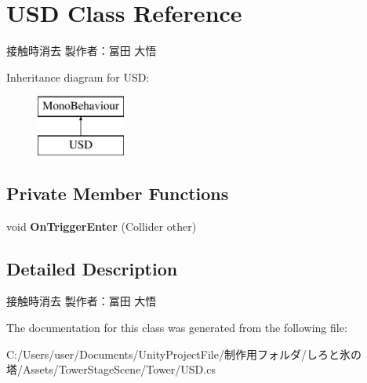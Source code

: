 \hypertarget{class_u_s_d}{}\section{U\+SD Class Reference}
\label{class_u_s_d}


接触時消去 製作者：冨田 大悟  


Inheritance diagram for U\+SD\+:\begin{figure}[H]
\begin{center}
\leavevmode
\includegraphics[height=2.000000cm]{class_u_s_d}
\end{center}
\end{figure}
\subsection*{Private Member Functions}
\begin{DoxyCompactItemize}
\item 
\mbox{\label{class_u_s_d_a606f7345e01f25c3c7901595c76ce921}} 
void {\bfseries On\+Trigger\+Enter} (Collider other)
\end{DoxyCompactItemize}


\subsection{Detailed Description}
接触時消去 製作者：冨田 大悟 



The documentation for this class was generated from the following file\+:\begin{DoxyCompactItemize}
\item 
C\+:/\+Users/user/\+Documents/\+Unity\+Project\+File/制作用フォルダ/しろと氷の塔/\+Assets/\+Tower\+Stage\+Scene/\+Tower/U\+S\+D.\+cs\end{DoxyCompactItemize}
